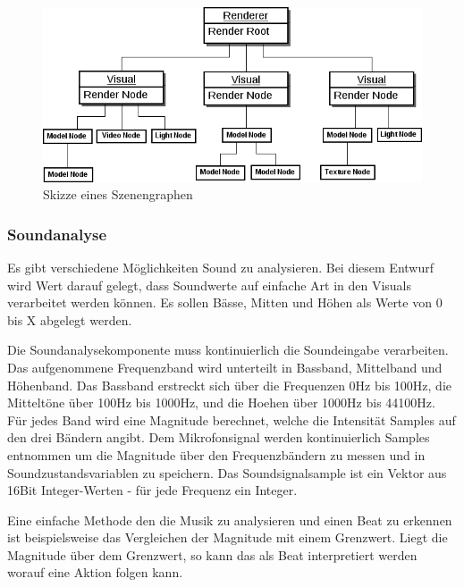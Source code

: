 \begin{figure}[h!]
    \centering
    \includegraphics[width=1\textwidth]{pictures/data_structure1.png}
    \caption{Skizze eines Szenengraphen}
\end{figure}


\subsubsection{Soundanalyse}

Es gibt verschiedene M\"oglichkeiten Sound zu analysieren. Bei diesem Entwurf wird Wert darauf gelegt, dass 
Soundwerte auf einfache Art in den Visuals verarbeitet werden k\"onnen. Es sollen B\"asse, Mitten und H\"ohen
als Werte von  0 bis X abgelegt werden.

Die Soundanalysekomponente muss kontinuierlich die Soundeingabe verarbeiten. Das aufgenommene Frequenzband
wird unterteilt in Bassband, Mittelband und H\"ohenband. 
Das Bassband erstreckt sich \"uber die Frequenzen 0Hz bis 100Hz, die Mittelt\"one \"uber 100Hz bis 1000Hz,
und die Hoehen \"uber 1000Hz bis 44100Hz.
F\"ur jedes Band wird eine Magnitude berechnet, welche die Intensit\"at Samples auf den drei B\"andern angibt.
Dem Mikrofonsignal werden kontinuierlich Samples entnommen um die Magnitude \"uber den Frequenzb\"andern zu 
messen und in Soundzustandsvariablen zu speichern. Das Soundsignalsample ist ein Vektor aus 16Bit Integer-Werten -
f\"ur jede Frequenz ein Integer.

Eine einfache Methode den die Musik zu analysieren und einen Beat zu erkennen ist beispielsweise das Vergleichen
der Magnitude mit einem Grenzwert. Liegt die Magnitude \"uber dem Grenzwert, so kann das als Beat interpretiert
werden worauf eine Aktion folgen kann.

